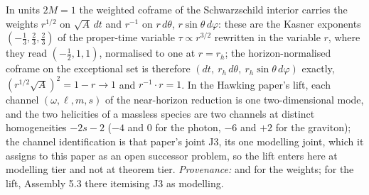 In units $2M = 1$ the weighted coframe of the Schwarzschild interior carries the weights $r^{1/2}$ on $\sqrt{A}\,dt$ and $r^{-1}$ on $r\,d\theta$, $r\sin\theta\,d\varphi$: these are the Kasner exponents $(-\tfrac13, \tfrac23, \tfrac23)$ of the proper-time variable $\tau \propto r^{3/2}$ rewritten in the variable $r$, where they read $(-\tfrac12, 1, 1)$, normalised to one at $r = r_h$; the horizon-normalised coframe on the exceptional set is therefore $(dt,\ r_h\,d\theta,\ r_h\sin\theta\,d\varphi)$ exactly, $(r^{1/2}\sqrt{A})^2 = 1 - r \to 1$ and $r^{-1}\cdot r = 1$. In the Hawking paper's lift, each channel $(\omega, \ell, m, s)$ of the near-horizon reduction is one two-dimensional mode, and the two helicities of a massless species are two channels at distinct homogeneities $-2s - 2$ ($-4$ and $0$ for the photon, $-6$ and $+2$ for the graviton); the channel identification is that paper's joint J3, its one modelling joint, which it assigns to this paper as an open successor problem, so the lift enters here at modelling tier and not at theorem tier. \emph{Provenance:} \cite[Lemmas 5.1 to 5.3, Def.~5.5]{ButlerT6} and \cite[Thm.~8.16]{ButlerT4} for the weights; \cite[Fact~5.1, Prop.~5.2, Assembly~5.3]{ButlerT7} for the lift, Assembly 5.3 there itemising J3 as modelling.
